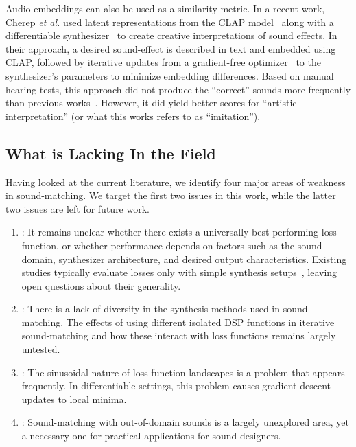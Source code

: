  Audio embeddings can also be used as a similarity metric. In a recent work, Cherep \textit{et al.} used latent representations from the CLAP model~\cite{wu2023large} along with a differentiable synthesizer~\cite{synthhaxcherep2023} to create creative interpretations of sound effects. In their approach, a desired sound-effect is described in text and embedded using CLAP, followed by iterative updates from a gradient-free optimizer~\cite{evosax2022github} to the synthesizer's parameters to minimize embedding differences. Based on manual hearing tests, this approach did not produce the ``correct'' sounds more frequently than previous works~\cite{kreuk2022audiogen}. However, it did yield better scores for ``artistic-interpretation'' (or what this works refers to as ``imitation'').


\subsection{What is Lacking In the Field}
\label{sec:lacking}

Having looked at the current literature, we identify four major areas of weakness in sound-matching. We target the first two issues in this work, while the latter two issues are left for future work.
\begin{enumerate}
    \item \LossSelect: It remains unclear whether there exists a universally best-performing loss function, 
    or whether performance depends on factors such as the sound domain, synthesizer architecture, 
    and desired output characteristics. Existing studies typically evaluate losses only with simple synthesis 
    setups~\cite{vahidi2023mesostructures}, leaving open questions about their generality. 
    \item \SynthSelect: There is a lack of diversity in the synthesis methods used in sound-matching. The effects of using different isolated DSP functions in iterative sound-matching and how these interact with loss functions remains largely untested.
    \item \PeriodicLoss: The sinusoidal nature of loss function landscapes is a problem that appears frequently. In differentiable settings, this problem causes gradient descent updates to local minima. 
    \item \OutDomain: Sound-matching with out-of-domain sounds is a largely unexplored area, yet a necessary one for practical applications for sound designers.
\end{enumerate}

